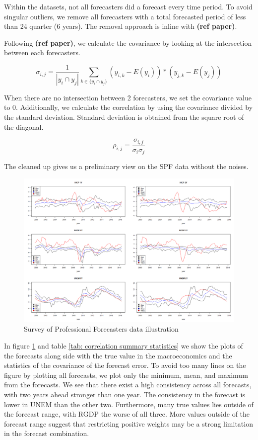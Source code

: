 \documentclass[]{article}
\begin{document}
Within the datasets, not all forecasters did a forecast every time
period. To avoid singular outliers, we remove all forecasters with a
total forecasted period of less than 24 quarter (6 years). The removal
approach is inline with \textbf{(ref paper)}.

Following \textbf{(ref paper)}, we calculate the covariance by looking
at the intersection between each forecasters.

\begin{equation}
\label{equation}
\sigma_{i,j} = \frac{1}{|y_i \cap y_j|}\sum_{k\in \{y_i \cap y_j\}} (y_{i,k}-E(y_i))*(y_{j,k}-E(y_j))
\end{equation}

When there are no intersection between 2 forecasters, we set the
covariance value to 0. Additionally, we calculate the correlation by
using the covariance divided by the standard deviation. Standard
deviation is obtained from the square root of the diagonal.

\begin{equation}
\label{eqn: cov2cor}
\rho_{i,j} = \frac{\sigma_{i,j}}{\sigma_{i}\sigma_{j}}
\end{equation}

The cleaned up gives us a preliminary view on the SPF data without the
noises.

\begin{figure}[!h]
\includegraphics{./Output/Images/SPF.png}
\caption{Survey of Professional Forecasters data illustration}\label{fig: SPF data illustration}
\end{figure}

In figure \ref{fig: SPF data illustration} and table
\ref{tab: correlation summary statistics} we show the plots of the
forecasts along side with the true value in the macroeconomics and the
statistics of the covariance of the forecast error. To avoid too many
lines on the figure by plotting all forecasts, we plot only the minimum,
mean, and maximum from the forecasts. We see that there exist a high
consistency across all forecasts, with two years ahead stronger than one
year. The consistency in the forecast is lower in UNEM than the other
two. Furthermore, many true values lies outside of the forecast range,
with RGDP the worse of all three. More values outside of the forecast
range suggest that restricting positive weights may be a strong
limitation in the forecast combination.
\end{document}
